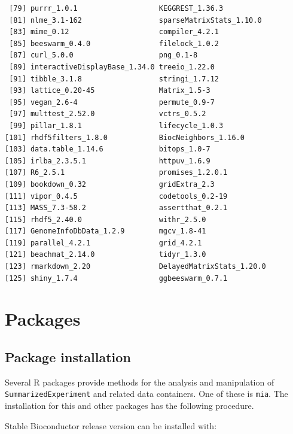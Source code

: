 \documentclass[
]{book}
\begin{document}
\begin{verbatim}
 [79] purrr_1.0.1                   KEGGREST_1.36.3              
 [81] nlme_3.1-162                  sparseMatrixStats_1.10.0     
 [83] mime_0.12                     compiler_4.2.1               
 [85] beeswarm_0.4.0                filelock_1.0.2               
 [87] curl_5.0.0                    png_0.1-8                    
 [89] interactiveDisplayBase_1.34.0 treeio_1.22.0                
 [91] tibble_3.1.8                  stringi_1.7.12               
 [93] lattice_0.20-45               Matrix_1.5-3                 
 [95] vegan_2.6-4                   permute_0.9-7                
 [97] multtest_2.52.0               vctrs_0.5.2                  
 [99] pillar_1.8.1                  lifecycle_1.0.3              
[101] rhdf5filters_1.8.0            BiocNeighbors_1.16.0         
[103] data.table_1.14.6             bitops_1.0-7                 
[105] irlba_2.3.5.1                 httpuv_1.6.9                 
[107] R6_2.5.1                      promises_1.2.0.1             
[109] bookdown_0.32                 gridExtra_2.3                
[111] vipor_0.4.5                   codetools_0.2-19             
[113] MASS_7.3-58.2                 assertthat_0.2.1             
[115] rhdf5_2.40.0                  withr_2.5.0                  
[117] GenomeInfoDbData_1.2.9        mgcv_1.8-41                  
[119] parallel_4.2.1                grid_4.2.1                   
[121] beachmat_2.14.0               tidyr_1.3.0                  
[123] rmarkdown_2.20                DelayedMatrixStats_1.20.0    
[125] shiny_1.7.4                   ggbeeswarm_0.7.1             
\end{verbatim}

\hypertarget{packages}{%
\chapter{Packages}\label{packages}}

\hypertarget{package-installation}{%
\section{Package installation}\label{package-installation}}

Several R packages provide methods for the analysis and manipulation
of \texttt{SummarizedExperiment} and related data containers. One of these is
\texttt{mia}. The installation for this and other packages has the following
procedure.

Stable Bioconductor release version can be installed with:
\end{document}
